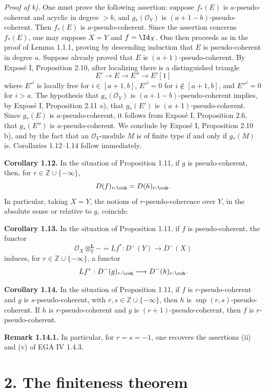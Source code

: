 \documentclass[11pt]{article}
\begin{document}
\emph{Proof of b).} One must prove the following assertion: suppose \(f_*(E)\) is \(a\)-pseudo-coherent and acyclic in degree \(>b\), and \(g_*(\mathcal O_Y)\) is \((a+1-b)\)-pseudo-coherent. Then \(f_*(E)\) is \(a\)-pseudo-coherent. Since the assertion concerns \(f_*(E)\), one may suppose \(X=Y\) and \(f=\Id_X\). One then proceeds as in the proof of Lemma 1.1.1, proving by descending induction that \(E\) is pseudo-coherent in degree \(a\). Suppose already proved that \(E\) is \((a+1)\)-pseudo-coherent. By Exposé I, Proposition 2.10, after localizing there is a distinguished triangle
\[
E'\longrightarrow E\longrightarrow E''\longrightarrow E'[1]
\]
where \(E'^i\) is locally free for \(i\in [a+1,b]\), \(E'^i=0\) for \(i\notin [a+1,b]\), and \(E''^i=0\) for \(i>a\). The hypothesis that \(g_*(\mathcal O_Y)\) is \((a+1-b)\)-pseudo-coherent implies, by Exposé I, Proposition 2.11 a), that \(g_*(E')\) is \((a+1)\)-pseudo-coherent. Since \(g_*(E)\) is \(a\)-pseudo-coherent, it follows from Exposé I, Proposition 2.6, that \(g_*(E'')\) is \(a\)-pseudo-coherent. We conclude by Exposé I, Proposition 2.10 b), and by the fact that an \(\mathcal O_Y\)-module \(M\) is of finite type if and only if \(g_*(M)\) is. Corollaries 1.12--1.14 follow immediately.

\textbf{Corollary 1.12.} In the situation of Proposition 1.11, if \(g\) is pseudo-coherent, then, for \(r\in\mathbb Z\cup\{-\infty\}\),
\[
  D(f)_{r\text{-}\coh}=D(h)_{r\text{-}\coh}.
\]
In particular, taking \(X=Y\), the notions of \(r\)-pseudo-coherence over \(Y\), in the absolute sense or relative to \(g\), coincide.

\textbf{Corollary 1.13.} In the situation of Proposition 1.11, if \(f\) is pseudo-coherent, the functor
\[
  \mathcal O_X\otimes_Y^{\mathbf L}-=Lf^*:D^{-}(Y)\longrightarrow D^{-}(X)
\]
induces, for \(r\in\mathbb Z\cup\{-\infty\}\), a functor
\[
  Lf^*:D^{-}(g)_{r\text{-}\coh}\longrightarrow D^{-}(h)_{r\text{-}\coh}.
\]

\textbf{Corollary 1.14.} In the situation of Proposition 1.11, if \(f\) is \(r\)-pseudo-coherent and \(g\) is \(s\)-pseudo-coherent, with \(r,s\in\mathbb Z\cup\{-\infty\}\), then \(h\) is \(\sup(r,s)\)-pseudo-coherent. If \(h\) is \(r\)-pseudo-coherent and \(g\) is \((r+1)\)-pseudo-coherent, then \(f\) is \(r\)-pseudo-coherent.

\textbf{Remark 1.14.1.} In particular, for \(r=s=-1\), one recovers the assertions (ii) and (v) of EGA IV 1.4.3.

\section*{2. The finiteness theorem}
\end{document}
